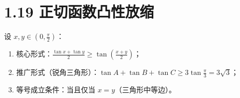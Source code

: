 \documentclass{article}
\begin{document}
\section*{1.19 正切函数凸性放缩}
设 \( x,y \in (0,\frac{\pi}{2}) \)：
\begin{enumerate}
    \item 核心形式：\( \frac{\tan x+\tan y}{2} \geq \tan\!\left(\frac{x+y}{2}\right) \)；
    \item 推广形式（锐角三角形）：\( \tan A+\tan B+\tan C \geq 3\tan\frac{\pi}{3}=3\sqrt{3} \)；
    \item 等号成立条件：当且仅当 \( x=y \)（三角形中等边）。
\end{enumerate}
\end{document}
